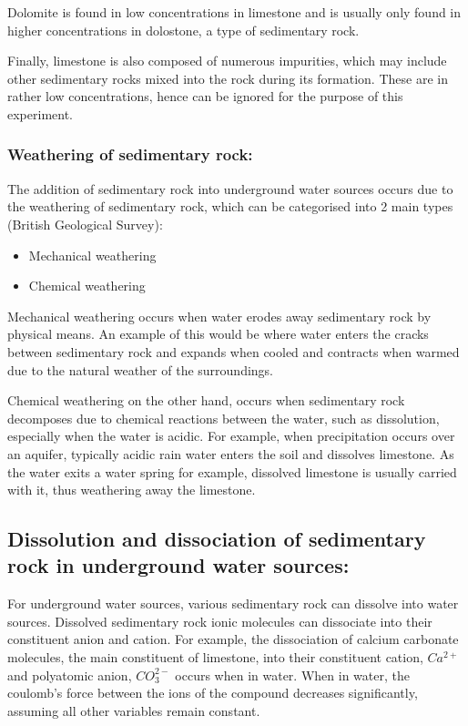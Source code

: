 \documentclass[11pt, a4]{article}
\begin{document}
				Dolomite is found in low concentrations in limestone and is usually only found in higher concentrations in dolostone, a type of sedimentary rock.

				Finally, limestone is also composed of numerous impurities, which may include other sedimentary rocks mixed into the rock during its formation. These are in rather low concentrations, hence can be ignored for the purpose of this experiment.

			\subsubsection{Weathering of sedimentary rock:}
				
				The addition of sedimentary rock into underground water sources occurs due to the weathering of sedimentary rock, which can be categorised into 2 main types (British Geological Survey):

				\begin{itemize}
					\item Mechanical weathering
					\item Chemical weathering
				\end{itemize}

				Mechanical weathering occurs when water erodes away sedimentary rock by physical means. An example of this would be where water enters the cracks between sedimentary rock and expands when cooled and contracts when warmed due to the natural weather of the surroundings.

				Chemical weathering on the other hand, occurs when sedimentary rock decomposes due to chemical reactions between the water, such as dissolution, especially when the water is acidic. For example, when precipitation occurs over an aquifer, typically acidic rain water enters the soil and dissolves limestone. As the water exits a water spring for example, dissolved limestone is usually carried with it, thus weathering away the limestone. 

			\subsection{Dissolution and dissociation of sedimentary rock in underground water sources:}
				For underground water sources, various sedimentary rock can dissolve into water sources. Dissolved sedimentary rock ionic molecules can dissociate into their constituent anion and cation. For example, the dissociation of calcium carbonate molecules, the main constituent of limestone, into their constituent cation, $Ca^{2+}$ and polyatomic anion, $CO_{3}^{2-}$ occurs when in water. When in water, the coulomb's force between the ions of the compound decreases significantly, assuming all other variables remain constant.
		
\end{document}
